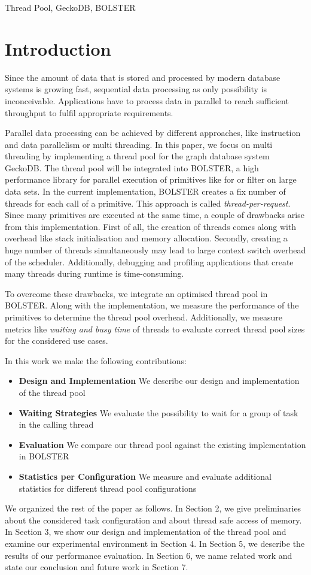 \documentclass[conference]{IEEEtran}
\begin{document}
\begin{IEEEkeywords}
Thread Pool, GeckoDB, BOLSTER
\end{IEEEkeywords}

\section{Introduction}
Since the amount of data that is stored and processed by modern database systems is growing fast, sequential data processing as only possibility is inconceivable. Applications have to process data in parallel to reach sufficient throughput to fulfil appropriate requirements.

Parallel data processing can be achieved by different approaches, like instruction and data parallelism or multi threading. In this paper, we focus on multi threading by implementing a thread pool for the graph database system GeckoDB. The thread pool will be integrated into BOLSTER, a high performance library for parallel execution of primitives like for or filter on large data sets. In the current implementation, BOLSTER creates a fix number of threads for each call of a primitive. This approach is called \emph{thread-per-request}. Since many primitives are executed at the same time, a couple of drawbacks arise from this implementation.
First of all, the creation of threads comes along with overhead like stack initialisation and memory allocation. Secondly, creating a huge number of threads simultaneously may lead to large context switch overhead of the scheduler. Additionally, debugging and profiling applications that create many threads during runtime is 	time-consuming.

To overcome these drawbacks, we integrate an optimised thread pool in BOLSTER. Along with the implementation, we measure the performance of the primitives to determine the thread pool overhead. Additionally, we measure metrics like \emph{waiting and busy time} of threads to evaluate correct thread pool sizes for the considered use cases. 

In this work we make the following contributions:
\begin{itemize}
	\item \textbf{Design and Implementation} We describe our design and implementation of the thread pool
	\item \textbf{Waiting Strategies} We evaluate the possibility to wait for a group of task in the calling thread
	\item \textbf{Evaluation} We compare our thread pool against the existing implementation in BOLSTER
	\item \textbf{Statistics per Configuration} We measure and evaluate additional statistics for different thread pool configurations
\end{itemize}
We organized the rest of the paper as follows. In Section 2, we give preliminaries about the considered task configuration and about thread safe access of memory. In Section 3, we show our design and implementation of the thread pool and examine our experimental environment in Section 4. In Section 5, we describe the results of our performance evaluation. In Section 6, we name related work and state our conclusion and future work in Section 7.
\end{document}
